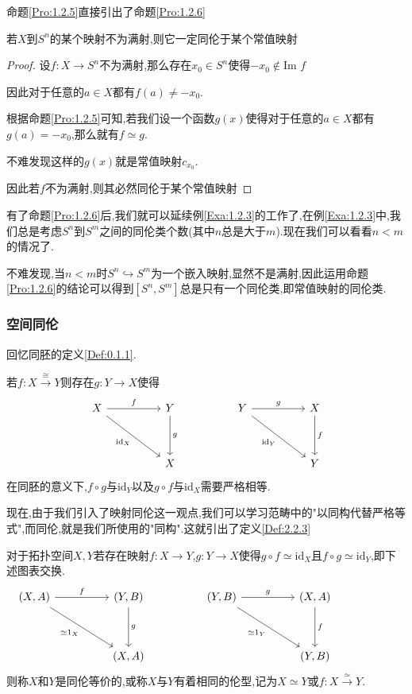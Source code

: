 \documentclass{article}
\begin{document}
命题\ref{Pro:1.2.5}直接引出了命题\ref{Pro:1.2.6}
\begin{proposition}
若$X$到$S^n$的某个映射不为满射,则它一定同伦于某个常值映射
    \label{Pro:1.2.6}
\end{proposition}
\begin{proof}
    设$f : X \to S^n$不为满射,那么存在$x_0 \in S^n$使得$-x_0 \notin \text{Im }f$


    因此对于任意的$a \in X$都有$f(a) \neq -x_0$.


    根据命题\ref{Pro:1.2.5}可知,若我们设一个函数$g(x)$使得对于任意的$a \in X$都有$g(a) = -x_0$,那么就有$f \simeq g$.


    不难发现这样的$g(x)$就是常值映射$c_{x_0}$.


    因此若$f$不为满射,则其必然同伦于某个常值映射
\end{proof}


有了命题\ref{Pro:1.2.6}后,我们就可以延续例\ref{Exa:1.2.3}的工作了,在例\ref{Exa:1.2.3}中,我们总是考虑$S^n$到$S^m$之间的同伦类个数(其中$n$总是大于$m$).现在我们可以看看$n<m$的情况了.


不难发现,当$n<m$时$S^n \hookrightarrow S^m$为一个嵌入映射,显然不是满射,因此运用命题\ref{Pro:1.2.6}的结论可以得到$[S^n,S^m]$总是只有一个同伦类,即常值映射的同伦类.

\subsubsection{空间同伦}
回忆同胚的定义\ref{Def:0.1.1}.


若$f : X \xrightarrow{\cong}Y$则存在$g : Y \to X$使得
\[\begin{tikzcd}
	X && Y && Y && X \\
	\\
	&& X &&&& Y
	\arrow["g", from=1-3, to=3-3]
	\arrow["f", from=1-1, to=1-3]
	\arrow["{\text{id}_X}"', from=1-1, to=3-3]
	\arrow["g", from=1-5, to=1-7]
	\arrow["f", from=1-7, to=3-7]
	\arrow["{\text{id}_Y}"', from=1-5, to=3-7]
\end{tikzcd}\]
在同胚的意义下,$f\circ g$与$\text{id}_Y$以及$g \circ f$与$\text{id}_X$需要严格相等.


现在,由于我们引入了映射同伦这一观点,我们可以学习范畴中的"以同构代替严格等式",而同伦,就是我们所使用的"同构".这就引出了定义\ref{Def:2.2.3}
\begin{definition}
对于拓扑空间$X,Y$若存在映射$f : X \to Y$,$g : Y \to X$使得$g \circ f \simeq \text{id}_X$且$f \circ g \simeq \text{id}_Y$,即下述图表交换.
\[\begin{tikzcd}
	{(X,A)} && {(Y,B)} && {(Y,B)} && {(X,A)} \\
	\\
	&& {(X,A)} &&&& {(Y,B)} 
	&& {}
	\arrow["g", from=1-3, to=3-3]
	\arrow["f", from=1-1, to=1-3]
	\arrow["{\simeq1_{X}}"', from=1-1, to=3-3]
	\arrow["g", from=1-5, to=1-7]
	\arrow["f", from=1-7, to=3-7]
	\arrow["{\simeq 1_{Y}}"', from=1-5, to=3-7]
\end{tikzcd}\]
则称$X$和$Y$是同伦等价的,或称$X$与$Y$有着相同的伦型,记为$X \simeq Y$或$f : X \xrightarrow{\simeq}Y$.
    \label{Def:1.2.3}
\end{definition}
\end{document}
